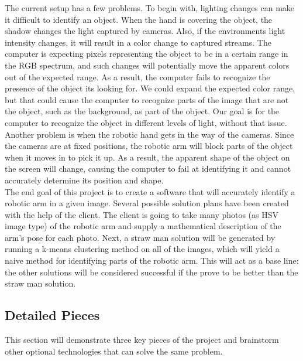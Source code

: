 \documentclass[10pt,journal,compsoc, draftclsnofoot,onecolumn]{IEEEtran}
\begin{document}
\noindent
The current setup has a few problems. To begin with, lighting changes can make it difficult to identify an object. When the hand is covering the object, the shadow changes the light captured by cameras. Also, if the environments light intensity changes, it will result in a color change to captured streams. The computer is expecting pixels representing the object to be in a certain range in the RGB spectrum, and such changes will potentially move the apparent colors out of the expected range. As a result, the computer fails to recognize the presence of the object its looking for. We could expand the expected color range, but that could cause the computer to recognize parts of the image that are not the object, such as the background, as part of the object. Our goal is for the computer to recognize the object in different levels of light, without that issue. \\

\noindent
Another problem is when the robotic hand gets in the way of the cameras. Since the cameras are at fixed positions, the robotic arm will block parts of the object when it moves in to pick it up. As a result, the apparent shape of the object on the screen will change, causing the computer to fail at identifying it and cannot accurately determine its position and shape. \\

\noindent
The end goal of this project is to create a software that will accurately identify a robotic arm in a given image. Several possible solution plans have been created with the help of the client. The client is going to take many photos (as HSV image type) of the robotic arm and supply a mathematical description of the arm's pose for each photo. Next, a straw man solution will be generated by running a k-means clustering method on all of the images, which will yield a naive method for identifying parts of the robotic arm. This will act as a base line: the other solutions will be considered successful if the prove to be better than the straw man solution.

\subsection{Detailed Pieces}
This section will demonstrate three key pieces of the project and brainstorm other optional technologies that can solve the same problem.
\end{document}

